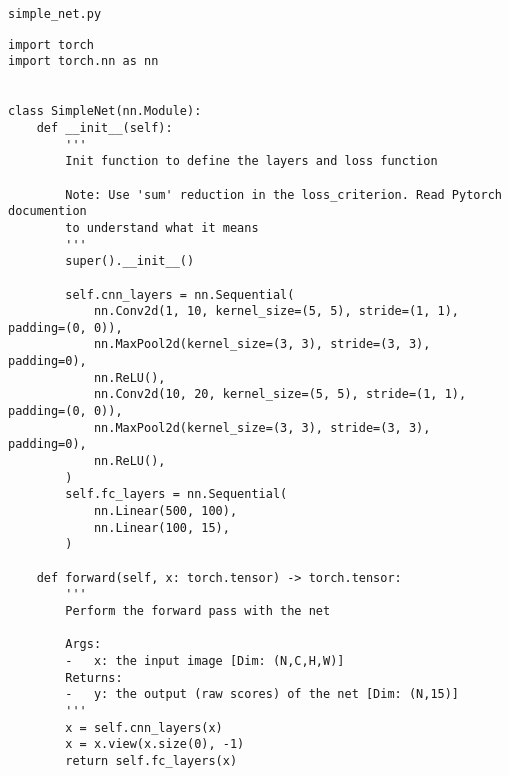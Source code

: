 \texttt{simple\_net.py}
\begin{lstlisting}[style=Python]
import torch
import torch.nn as nn


class SimpleNet(nn.Module):
    def __init__(self):
        '''
        Init function to define the layers and loss function

        Note: Use 'sum' reduction in the loss_criterion. Read Pytorch documention
        to understand what it means
        '''
        super().__init__()

        self.cnn_layers = nn.Sequential(
            nn.Conv2d(1, 10, kernel_size=(5, 5), stride=(1, 1), padding=(0, 0)),
            nn.MaxPool2d(kernel_size=(3, 3), stride=(3, 3), padding=0),
            nn.ReLU(),
            nn.Conv2d(10, 20, kernel_size=(5, 5), stride=(1, 1), padding=(0, 0)),
            nn.MaxPool2d(kernel_size=(3, 3), stride=(3, 3), padding=0),
            nn.ReLU(),
        )
        self.fc_layers = nn.Sequential(
            nn.Linear(500, 100),
            nn.Linear(100, 15),
        )

    def forward(self, x: torch.tensor) -> torch.tensor:
        '''
        Perform the forward pass with the net

        Args:
        -   x: the input image [Dim: (N,C,H,W)]
        Returns:
        -   y: the output (raw scores) of the net [Dim: (N,15)]
        '''
        x = self.cnn_layers(x)
        x = x.view(x.size(0), -1)
        return self.fc_layers(x)
\end{lstlisting}

